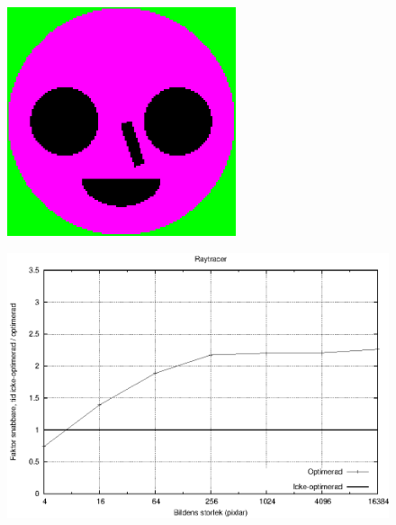 \documentclass{beamer}
\begin{document}
\begin{frame}


\begin{figure}[H]
\centering
    \includegraphics[width=0.6\textwidth]{img/shapes.png} 
\end{figure}


\end{frame}
\begin{frame}
\begin{figure}[H]
\includegraphics[width=1\textwidth]{shapesnormnocb.eps}
\end{figure}


\end{frame}

\end{document}
